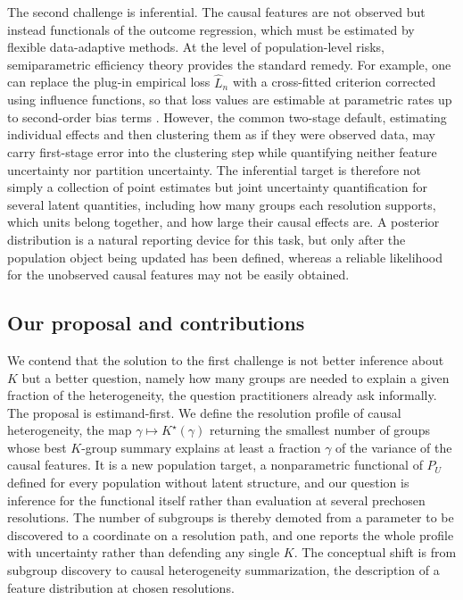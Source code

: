 \documentclass[11pt]{article}
\begin{document}
The second challenge is inferential. The causal features are not observed but instead functionals of the outcome regression, which must be estimated by flexible data-adaptive methods. At the level of population-level risks, semiparametric efficiency theory provides the standard remedy. For example, one can replace the plug-in empirical loss $\widehat L_n$ with a cross-fitted criterion corrected using influence functions, so that loss values are estimable at parametric rates up to second-order bias terms \citep{chernozhukov2018,kennedy2023review}. However, the common two-stage default, estimating individual effects and then clustering them as if they were observed data, may carry first-stage error into the clustering step while quantifying neither feature uncertainty nor partition uncertainty. The inferential target is therefore not simply a collection of point estimates but joint uncertainty quantification for several latent quantities, including how many groups each resolution supports, which units belong together, and how large their causal effects are. A posterior distribution is a natural reporting device for this task, but only after the population object being updated has been defined, whereas a reliable likelihood for the unobserved causal features may not be easily obtained.



\subsection{Our proposal and contributions}\label{sec:intro:proposal}


We contend that the solution to the first challenge is not better inference about $K$ but a better question, namely how many groups are needed to explain a given fraction of the heterogeneity, the question practitioners already ask informally. The proposal is estimand-first. We define the resolution profile of causal heterogeneity, the map $\gamma\mapsto K^\star(\gamma)$ returning the smallest number of groups whose best $K$-group summary explains at least a fraction $\gamma$ of the variance of the causal features. It is a new population target, a nonparametric functional of $P_U$ defined for every population without latent structure, and our question is inference for the functional itself rather than evaluation at several prechosen resolutions. The number of subgroups is thereby demoted from a parameter to be discovered to a coordinate on a resolution path, and one reports the whole profile with uncertainty rather than defending any single $K$. The conceptual shift is from subgroup discovery to causal heterogeneity summarization, the description of a feature distribution at chosen resolutions.
\end{document}
